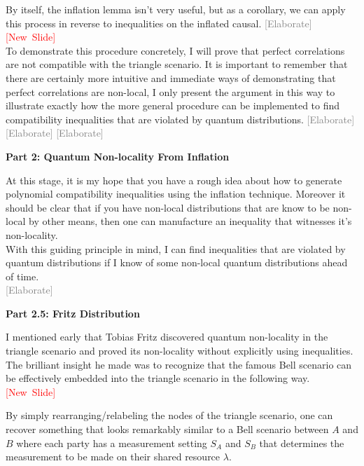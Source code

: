 \documentclass{article}
\newcommand{\newslide}{\textcolor{red}{[New~Slide]}}
\newcommand{\elaborate}{\textcolor{gray}{[Elaborate]}}
\begin{document}
    By itself, the inflation lemma isn't very useful, but as a corollary, we can apply this process in reverse to inequalities on the inflated causal.
    \elaborate
    \newslide\\
    To demonstrate this procedure concretely, I will prove that perfect correlations are not compatible with the triangle scenario. It is important to remember that there are certainly more intuitive and immediate ways of demonstrating that perfect correlations are non-local, I only present the argument in this way to illustrate exactly how the more general procedure can be implemented to find compatibility inequalities that are violated by quantum distributions.
    \elaborate
    \elaborate
    \elaborate

    \begin{center}
        \textbf{Part 2: Quantum Non-locality From Inflation}
    \end{center}

    At this stage, it is my hope that you have a rough idea about how to generate polynomial compatibility inequalities using the inflation technique. Moreover it should be clear that if you have non-local distributions that are know to be non-local by other means, then one can manufacture an inequality that witnesses it's non-locality. \\

    With this guiding principle in mind, I can find inequalities that are violated by quantum distributions if I know of some non-local quantum distributions ahead of time. \\

    \elaborate

    \begin{center}
        \textbf{Part 2.5: Fritz Distribution}
    \end{center}

    I mentioned early that Tobias Fritz discovered quantum non-locality in the triangle scenario and proved its non-locality without explicitly using inequalities. The brilliant insight he made was to recognize that the famous Bell scenario can be effectively embedded into the triangle scenario in the following way. \\

    \newslide

    By simply rearranging/relabeling the nodes of the triangle scenario, one can recover something that looks remarkably similar to a Bell scenario between $A$ and $B$ where each party has a measurement setting $S_A$ and $S_B$ that determines the measurement to be made on their shared resource $\lambda$. \\
\end{document}
